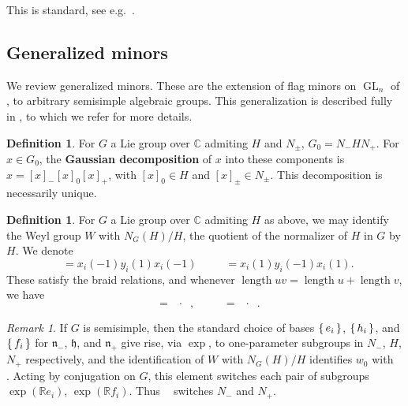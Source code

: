 \documentclass{amsart}
\theoremstyle{plain}
\theoremstyle{definition}
\newtheorem{definition}[theorem]{Definition}
\theoremstyle{remark}
\newtheorem{remark}[theorem]{Remark}
\newcommand{\defined}[1]{\textbf{#1}}
\newcommand{\lifttoG}[1]{{\mathop{\overline{#1}}}}
\newcommand{\dlifttoG}[1]{{\mathop{\overline{\overline{#1}}}}}
\DeclareMathOperator{\GL}{GL}
\DeclareMathOperator{\length}{length}
\begin{document}
  This is standard, see
  e.g.~\cite[Chapter~VI,~\S~1.11]{bourbaki2002_46}.

  \subsection{Generalized minors}

  \label{sec:generalized-minors}

  We review generalized minors. These are the extension of flag minors
  on $\GL_n$ of \cite{fominzelevinsky1996},
  \cite{berensteinzelevinsky1997} to arbitrary semisimple algebraic
  groups. This generalization is described fully in
  \cite{fominzelevinsky1999}, to which we refer for more details.

  \begin{definition}
    \label{def:gaussian-decomposition}
    For $G$ a Lie group over $\mathbb{C}$ admiting $H$ and $N_{\pm}$,
    $G_0 = N_{-} H N_{+}$. For $x \in G_0$, the \defined{Gaussian
      decomposition} of $x$ into these components is $x = [x]_{-}
    [x]_{0} [x]_{+}$, with $[x]_{0} \in H$ and $[x]_{\pm} \in N_{\pm}$.
    This decomposition is necessarily unique.
  \end{definition}

  \begin{definition}
    For $G$ a Lie group over $\mathbb{C}$ admiting $H$ as above, we may
    identify the Weyl group $W$ with $N_G(H)/H$, the quotient of the
    normalizer of $H$ in $G$ by $H$. We denote \[ \lifttoG{s_i} =
      x_i(-1) y_i(1) x_i(-1) \qquad \dlifttoG{s_i} = x_i(1) y_i(-1)
      x_i(1). \] These satisfy the braid relations, and whenever
    $\length{u v} = \length{u} + \length{v}$, we have \[ \lifttoG{u v} =
      \lifttoG{u} \cdot \lifttoG{v}, \qquad \dlifttoG{u v} =
      \dlifttoG{u} \cdot \dlifttoG{v}. \]

  \end{definition}

  \begin{remark}
    \label{rem:w0-switches-Ns}
    If $G$ is semisimple, then the standard choice of bases $\set{e_i}$,
    $\set{h_i}$, and $\set{f_i}$ for $\mathfrak{n}_{-}$, $\mathfrak{h}$,
    and $\mathfrak{n}_{+}$ give rise, via $\exp$, to one-parameter
    subgroups in $N_{-}$, $H$, $N_{+}$ respectively, and the
    identification of $W$ with $N_G(H)/H$ identifies $w_0$ with
    $\lifttoG{w_0}$. Acting by conjugation on $G$, this element switches
    each pair of subgroups $\exp(\mathbb{R}e_i)$, $\exp(\mathbb{R}f_i)$.
    Thus $\lifttoG{w_0}$ switches $N_{-}$ and $N_{+}$.
  \end{remark}
\end{document}
